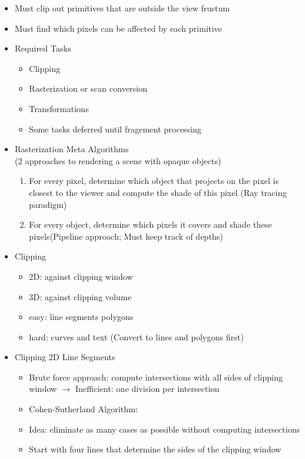 \documentclass[11pt,a4paper]{article}
\begin{document}
		\begin{itemize}
			\item Must clip out primitives that are outside the view frustum
			\item Must find which pixels can be affected by each primitive
			\item Required Tasks
				\begin{itemize}
					\item Clipping
					\item Rasterization or scan conversion
					\item Transformations 
					\item Some tasks deferred until fragement processing
				\end{itemize}
			\item Rasterization Meta Algorithms\\(2 approaches to rendering a scene with opaque objects)
				\begin{enumerate}
					\item For every pixel, determine which object that projects on the pixel is closest to the viewer and compute the shade of this pixel (Ray tracing paradigm)
					\item For every object, determine which pixels it covers and shade these pixels(Pipeline approach; Must keep track of depths)
				\end{enumerate}
			\item Clipping
				\begin{itemize}
					\item 2D: against clipping window
					\item 3D: against clipping volume
					\item easy: line segments polygons
					\item hard: curves and text (Convert to lines and polygons first)
				\end{itemize}
			\item Clipping 2D Line Segments
				\begin{itemize}
					\item Brute force approach: compute intersections with all sides of clipping window
					$\rightarrow$ Inefficient: one division per intersection
					\item Cohen-Sutherland Algorithm:
					\item Idea: eliminate as many cases as possible without computing intersections
					\item Start with four lines that determine the sides of the clipping window

\end{itemize}
\end{itemize}
\end{document}
